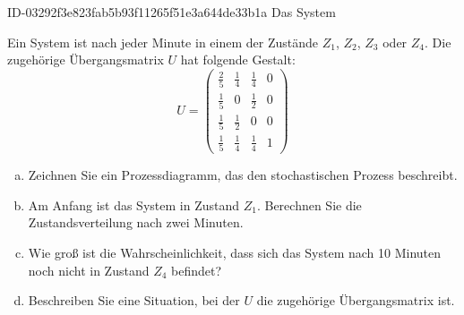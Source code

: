 \begin{exercise}
      {ID-03292f3e823fab5b93f11265f51e3a644de33b1a}
      {Das System}
  \ifproblem\problem\par
    Ein System ist nach jeder Minute in einem der
    Zustände $Z_1$, $Z_2$, $Z_3$ oder $Z_4$.
    Die zugehörige Übergangsmatrix $U$ hat folgende
    Gestalt:
    \begin{equation*}
      U=
      \begin{pmatrix}
        \frac{2}{5} & \frac{1}{4} & \frac{1}{4} & 0 \\[1ex]
        \frac{1}{5} & 0           & \frac{1}{2} & 0 \\[1ex]
        \frac{1}{5} & \frac{1}{2} & 0           & 0 \\[1ex]
        \frac{1}{5} & \frac{1}{4} & \frac{1}{4} & 1
      \end{pmatrix}
    \end{equation*}
    \begin{enumerate}[a)]
      \item Zeichnen Sie ein Prozessdiagramm, das
            den stochastischen Prozess beschreibt.
      \item Am Anfang ist das System in Zustand $Z_1$.
            Berechnen Sie die Zustandsverteilung nach
            zwei Minuten.
      \item Wie groß ist die Wahrscheinlichkeit, dass
            sich das System nach \num{10} Minuten
            noch nicht in Zustand $Z_4$ befindet?
      \item Beschreiben Sie eine Situation, bei der
            $U$ die zugehörige Übergangsmatrix ist.
    \end{enumerate}
  \fi
\end{exercise}
